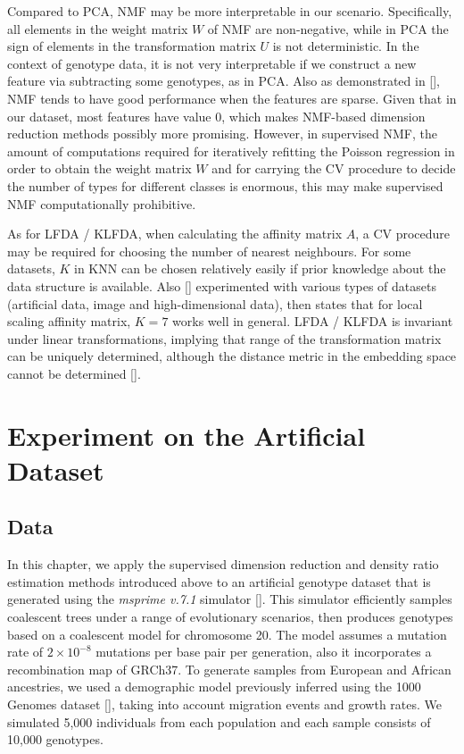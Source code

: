 \documentclass[a4paper,12pt]{article}
\begin{document}
Compared to PCA, NMF may be more interpretable in our scenario. Specifically, all elements in the weight matrix $W$ of NMF are non-negative, while in PCA the sign of elements in the transformation matrix $U$ is not deterministic. In the context of genotype data, it is not very interpretable if we construct a new feature via subtracting some genotypes, as in PCA. Also as demonstrated in [\cite{lee2001algorithms}], NMF tends to have good performance when the features are sparse. Given that in our dataset, most features have value 0, which makes NMF-based dimension reduction methods possibly more promising. However, in supervised NMF, the amount of computations required for iteratively refitting the Poisson regression in order to obtain the weight matrix $W$ and for carrying the CV procedure to decide the number of types for different classes is enormous, this may make supervised NMF computationally prohibitive.

As for LFDA / KLFDA, when calculating the affinity matrix $A$, a CV procedure may be required for choosing the number of nearest neighbours. For some datasets, $K$ in KNN can be chosen relatively easily if prior knowledge about the data structure is available. Also [\cite{zelnik2005self}] experimented with various types of datasets (artificial data, image and high-dimensional data), then states that for local scaling affinity matrix, $K = 7$ works well in general. LFDA / KLFDA is invariant under linear transformations, implying that range of the transformation matrix can be uniquely determined, although the distance metric in the embedding space cannot be determined [\cite{sugiyama2007dimensionality}].
\pagebreak

%
%
%

\section{Experiment on the Artificial Dataset} \label{Results}
\subsection{Data}
In this chapter, we apply the supervised dimension reduction and density ratio estimation methods introduced above to an artificial genotype dataset that is generated using the  \textit{msprime v.7.1} simulator [\cite{kelleher2016efficient}]. This simulator efficiently samples coalescent trees under a range of evolutionary scenarios, then produces genotypes based on a coalescent model for chromosome 20. The model assumes a mutation rate of $2 \times 10^{−8}$ mutations per base pair per generation, also it incorporates a recombination map of GRCh37. To generate samples from European and African ancestries, we used a demographic model previously inferred using the 1000 Genomes dataset [\cite{gravel2011demographic}], taking into account migration events and growth rates. We simulated 5,000 individuals from each population and each sample consists of 10,000 genotypes.
\end{document}
